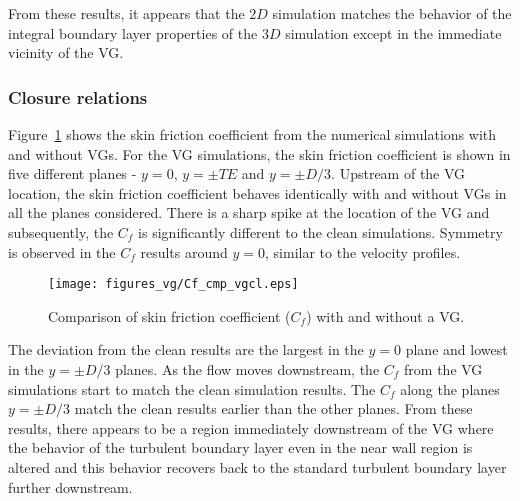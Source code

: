 From these results, it appears that the $2D$ simulation matches the behavior of the integral boundary layer properties of the $3D$ simulation except in the immediate vicinity of the VG. 

\subsubsection{Closure relations}
Figure~\ref{fig:cfcmpvgcl} shows the skin friction coefficient from the numerical simulations with and without VGs. For the VG simulations, the skin friction coefficient is shown in five different planes - $y=0$, $y=\pm TE$ and $y=\pm D/3$. Upstream of the VG location, the skin friction coefficient behaves identically with and without VGs in all the planes considered. There is a sharp spike at the location of the VG and subsequently, the $C_f$ is significantly different to the clean simulations. Symmetry is observed in the $C_f$ results around $y=0$, similar to the velocity profiles. 
\begin{figure}[h!]
    \centering
    \captionsetup{justification=centering}
      \texttt{[image: figures\_vg/Cf\_cmp\_vgcl.eps]}
      \caption{Comparison of skin friction coefficient ($C_f$) with and without a VG.}
    \label{fig:cfcmpvgcl}
\end{figure}
The deviation from the clean results are the largest in the $y=0$ plane and lowest in the $y=\pm D/3$ planes. As the flow moves downstream, the $C_f$ from the VG simulations start to match the clean simulation results. The $C_f$ along the planes $y=\pm D/3$ match the clean results earlier than the other planes. From these results, there appears to be a region immediately downstream of the VG where the behavior of the turbulent boundary layer even in the near wall region is altered and this behavior recovers back to the standard turbulent boundary layer further downstream. 


